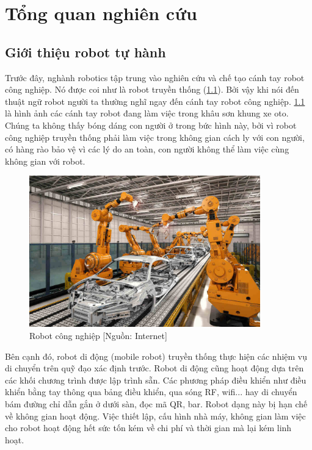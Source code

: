 \chapter{Tổng quan nghiên cứu}
\label{chap:1tqnc}
\section{Giới thiệu robot tự hành}


% 

Trước đây, nghành robotics tập trung vào nghiên cứu và chế tạo cánh tay robot công nghiệp. Nó được coi như là robot truyền thống (\figurename{\ref{fig:RBCongNghiep}}). Bởi vậy khi nói đến thuật ngữ robot người ta thường nghĩ ngay đến cánh tay robot công nghiệp. \figurename{\ref{fig:RBCongNghiep}} là hình ảnh các cánh tay robot đang làm việc trong khâu sơn khung xe oto. Chúng ta không thấy bóng dáng con người ở trong bức hình này, bởi vì robot công nghiệp truyền thống phải làm việc trong không gian cách ly với con người, có hàng rào bảo vệ vì các lý do an toàn, con người không thể làm việc cùng không gian với robot. 

\begin{figure}[hpt]
  \centering
  \includegraphics[width=10cm]{figures/IndustrialRobot.jpg}
  \caption{Robot công nghiệp [Nguồn: Internet]}
  \label{fig:RBCongNghiep}
\end{figure}

Bên cạnh đó, robot di động (mobile robot) truyền thống thực hiện các nhiệm vụ di chuyển trên quỹ đạo xác định trước. Robot di động cũng hoạt động dựa trên các khối chương trình được lập trình sẵn. Các phương pháp điều khiển như điều khiển bằng tay thông qua bảng điều khiển, qua sóng RF, wifi... hay di chuyển bám đường chỉ dẫn gắn ở dưới sàn, đọc mã QR, bar. Robot dạng này bị hạn chế về không gian hoạt động. Việc thiết lập, cấu hình nhà máy, không gian làm việc cho robot hoạt động hết sức tốn kém về chi phí và thời gian mà lại kém linh hoạt.

